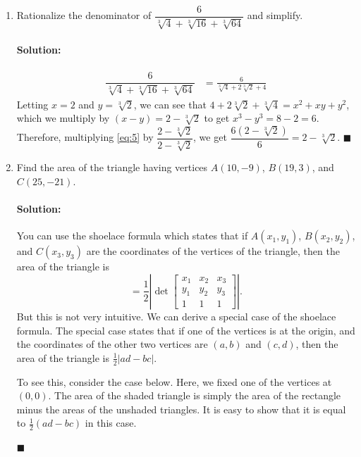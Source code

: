 \documentclass{article}
\newenvironment{solution}{\paragraph{Solution:}}{\hfill$\blacksquare$}
\begin{document}
\begin{enumerate}
\begin{solution}
	$CD$ has length $\frac{5}{3}$ or $\frac{1}{3}$ the length of $CA$. Draw segment $DG\perp BC$. Then $DG$ is $\frac{1}{3}$ of $AB$, or $DG=1$. Also, $CG=\frac{1}{3}\cdot BC=\frac{4}{3}$ so that $EC=\frac{8}{3}$ and $BE=4-\frac{8}{3}=\frac{4}{3}$. Therefore, the perimeter of $ABED$ is $\frac{4}{3}+\frac{5}{3}+\frac{10}{3}+3=9\frac{1}{3}$.
	
	\end{solution}

	
	\item Rationalize the denominator of $\dfrac{6}{\sqrt[3]{4}+\sqrt[3]{16}+\sqrt[3]{64}}$ and simplify.
	
	\begin{solution}
		\begin{align}
			\dfrac{6}{\sqrt[3]{4}+\sqrt[3]{16}+\sqrt[3]{64}} & = \frac{6}{\sqrt[3]{4}+2\sqrt[3]{2} + 4}\label{eq:5}
		\end{align}
		Letting $x=2$ and $y=\sqrt[3]{2}$, we can see that $4+2\sqrt[3]{2} + \sqrt[3]{4}=x^2 +xy+y^2$, which we multiply by $(x-y)=2-\sqrt[3]{2}$ to get $x^3-y^3=8-2=6$. Therefore, multiplying \eqref{eq:5} by $\dfrac{2-\sqrt[3]{2}}{2-\sqrt[3]{2}}$, we get $\dfrac{6(2-\sqrt[3]{2})}{6}=2-\sqrt[3]{2}$.
	\end{solution}

	\item Find the area of the triangle having vertices $A(10,-9)$, $B(19,3)$, and $C(25,-21)$.
	
	\begin{solution}
		You can use the shoelace formula which states that if $A(x_1, y_1)$, $B(x_2,y_2)$, and $C(x_3,y_3)$ are the coordinates of the vertices of the triangle, then the area of the triangle is
		\begin{equation}
			[ABC] = \frac{1}{2}\left\lvert \det \begin{bmatrix}
			x_1 & x_2 & x_3\\
			y_1 & y_2 & y_3\\
			1 & 1 & 1
			\end{bmatrix} \right\rvert.
		\end{equation}
		But this is not very intuitive. We can derive a special case of the shoelace formula. The special case states that if one of the vertices is at the origin, and the coordinates of the other two vertices are $(a,b)$ and $(c,d)$, then the area of the triangle is $\frac{1}{2}\lvert ad-bc\rvert$.
		
		To see this, consider the case below. Here, we fixed one of the vertices at $(0,0)$. The area of the shaded triangle is simply the area of the rectangle minus the areas of the unshaded triangles. It is easy to show that it is equal to $\frac{1}{2}(ad-bc)$ in this case.
		

\end{solution}
\end{enumerate}
\end{document}
